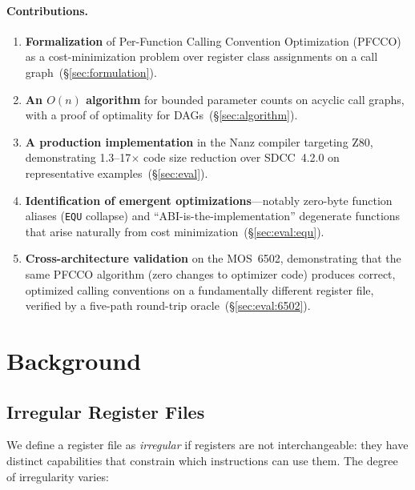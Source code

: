 \documentclass[sigplan,screen,nonacm]{acmart}
\begin{document}
\paragraph{Contributions.}
\begin{enumerate}
\item \textbf{Formalization} of Per-Function Calling Convention Optimization
  (PFCCO) as a cost-minimization problem over register class assignments on
  a call graph~(\S\ref{sec:formulation}).
\item \textbf{An $O(n)$ algorithm} for bounded parameter counts on acyclic
  call graphs, with a proof of optimality for
  DAGs~(\S\ref{sec:algorithm}).
\item \textbf{A production implementation} in the Nanz compiler targeting
  Z80, demonstrating 1.3--17$\times$ code size reduction over SDCC~4.2.0 on
  representative examples~(\S\ref{sec:eval}).
\item \textbf{Identification of emergent optimizations}---notably zero-byte
  function aliases (\texttt{EQU} collapse) and ``ABI-is-the-implementation''
  degenerate functions that arise naturally from cost
  minimization~(\S\ref{sec:eval:equ}).
\item \textbf{Cross-architecture validation} on the MOS~6502, demonstrating
  that the same PFCCO algorithm (zero changes to optimizer code) produces
  correct, optimized calling conventions on a fundamentally different register
  file, verified by a five-path round-trip oracle~(\S\ref{sec:eval:6502}).
\end{enumerate}

\section{Background}
\label{sec:background}

\subsection{Irregular Register Files}
\label{sec:irregular}

We define a register file as \emph{irregular} if registers are not
interchangeable: they have distinct capabilities that constrain which
instructions can use them.  The degree of irregularity varies:
\end{document}
